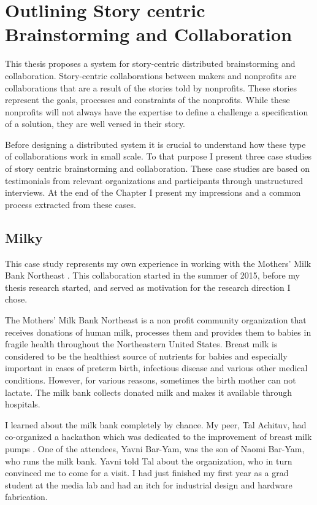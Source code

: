 \chapter{Outlining Story centric Brainstorming and Collaboration }
\label{chap_anatomy}

This thesis proposes a system for story-centric distributed brainstorming and collaboration. Story-centric collaborations between makers and nonprofits are collaborations that are a result of the stories told by nonprofits. These stories represent the goals, processes and constraints of the nonprofits. While these nonprofits will not always have the expertise to define a challenge a specification of a solution, they are well versed in their story.

Before designing a distributed system it is crucial to understand how these type of collaborations work in small scale. To that purpose I present three case studies of story centric brainstorming and collaboration. These case studies are based on testimonials from relevant organizations and participants through unstructured interviews. At the end of the Chapter I present my impressions and a common process extracted from these cases. 

\section{Milky}
This case study represents my own experience in working with the Mothers' Milk Bank Northeast \cite{mmne}. This collaboration started in the summer of 2015, before my thesis research started, and served as motivation for the research direction I chose.

The Mothers' Milk Bank Northeast is a non profit community organization that receives donations of human milk, processes them and provides them to babies in fragile health throughout the Northeastern United States. Breast milk is considered to be the healthiest source of nutrients for babies and especially important in cases of preterm birth, infectious disease and various other medical conditions.\cite{} However, for various reasons, sometimes the birth mother can not lactate. The milk bank collects donated milk and makes it available through hospitals. 

I learned about the milk bank completely by chance. My peer, Tal Achituv, had co-organized a hackathon which was dedicated to the improvement of breast milk pumps \cite{d2016feminist}. One of the attendees, Yavni Bar-Yam, was the son of Naomi Bar-Yam, who runs the milk bank. Yavni told Tal about the organization, who in turn convinced me to come for a visit. I had just finished my first year as a grad student at the media lab and had an itch for industrial design and hardware fabrication.

